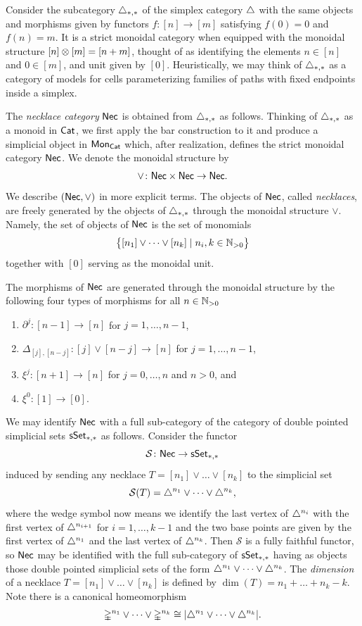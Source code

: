 Consider the subcategory $\triangle_{*,*}$ of the simplex category $\triangle$ with the same objects and morphisms given by functors $f \colon [n] \to [m]$ satisfying $f(0) = 0$ and $f(n) = m$.
It is a strict monoidal category when equipped with the monoidal structure $[n] \otimes [m] = [n+m]$, thought of as identifying the elements $n \in [n]$ and $0 \in [m]$, and unit given by $[0]$.
Heuristically, we may think of $\triangle_{*,*}$ as a category of models for cells parameterizing families of paths with fixed endpoints inside a simplex.

The \textit{necklace category} $\mathsf{Nec}$ is obtained from $\triangle_{*,*}$ as follows.
Thinking of $\triangle_{*,*}$ as a monoid in $\mathsf{Cat}$, we first apply the bar construction to it and produce a simplicial object in $\mathsf{Mon}_{\mathsf{Cat}}$ which, after realization, defines the strict monoidal category $\mathsf{Nec}$.
We denote the monoidal structure by
\[
\vee \colon \mathsf{Nec} \times \mathsf{Nec} \to \mathsf{Nec}.
\]
We describe $(\mathsf{Nec}, \vee)$ in more explicit terms.
The objects of $\mathsf{Nec}$, called \textit{necklaces}, are freely generated by the objects of $\triangle_{*,*}$ through the monoidal structure $\vee$.
Namely, the set of objects of $\mathsf{Nec}$ is the set of monomials
\[
\big\{ [n_1] \vee \dots \vee[n_k] \mid n_i, k \in \mathbb{N}_{>0} \big\}
\]
together with $[0]$ serving as the monoidal unit.

The morphisms of $\mathsf{Nec}$ are generated through the monoidal structure by the following four types of morphisms for all $n \in\mathbb{N}_{>0}$
\begin{enumerate}
	\item $\partial^j \colon [n-1] \to [n]$ for $j = 1, \dots, n-1$,
	\item $\Delta_{[j], [n-j]} \colon [j] \vee [n-j] \to [n]$ for $j = 1, \dots, n-1$,
	\item $\xi^j \colon [n+1] \to [n]$ for $j = 0, \dots, n$ and $n>0$, and
	\item $\xi^0 \colon [1] \to [0]$.
\end{enumerate}
We may identify $\mathsf{Nec}$ with a full sub-category of the category of double pointed simplicial sets $\mathsf{sSet}_{*,*}$ as follows.
Consider the functor
\[
\mathcal{S} \colon \mathsf{Nec} \to \mathsf{sSet}_{*,*}
\]
induced by sending any necklace $T = [n_1] \vee \dots \vee[n_k]$ to the simplicial set
\[
\mathcal{S}(T) = \triangle^{n_1} \vee \dots \vee \triangle^{n_k},
\]
where the wedge symbol now means we identify the last vertex of $\triangle^{n_i}$ with the first vertex of $\triangle^{n_{i+1}}$ for $i = 1, \dots, k-1$ and the two base points are given by the first vertex of $\triangle^{n_1}$ and the last vertex of $\triangle^{n_k}$.
Then $\mathcal{S}$ is a fully faithful functor, so $\mathsf{Nec}$ may be identified with the full sub-category of $\mathsf{sSet}_{*,*}$ having as objects those double pointed simplicial sets of the form $\triangle^{n_1} \vee \dots \vee \triangle^{n_k}$.
The \textit{dimension} of a necklace $T = [n_1] \vee\dots\vee [n_k]$ is defined by $\dim(T) = n_1 + \dots + n_k-k$.
Note there is a canonical homeomorphism \[\mathbb{\Delta}^{n_1} \vee \cdots \vee \mathbb{\Delta}^{n_k} \cong | \triangle^{n_1} \vee \cdots \vee \triangle^{n_k}|.\]


